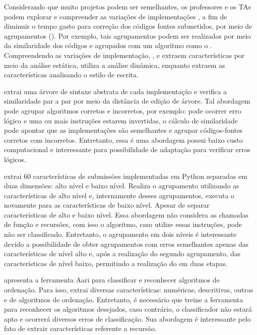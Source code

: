 	Considerando que muito projetos podem ser semelhantes, os professores e os TAs podem
	explorar e compreender as variações de implementações \cite{Yin:2015}, a fim de
	diminuir o tempo gasto para correção dos códigos fontes submetidos, por meio de
	agrupamentos (). Por exemplo, tais agrupamentos podem ser
	realizados por meio da similaridade dos códigos e agrupados com um algoritmo como
	o . Compreendendo as variações de implementação, ,
	 e  extraem características
	por meio da análise estática,  utiliza a análise dinâmica,
	enquanto  extraem as características analisando o estilo de escrita.
	
	 extrai uma árvore de sintaxe abstrata de cada implementação
	e verifica a similaridade par a par por meio da distância de edição de árvore. Tal
	abordagem pode agrupar algoritmos corretos e incorretos, por exemplo: pode ocorrer
	erro lógico e uma ou mais instruções estarem invertidas, o cálculo de similaridade
	pode apontar que as implementações são semelhantes e agrupar códigos-fontes corretos
	com incorretos. Entretanto, essa é uma abordagem possui baixo custo computacional e
	interessante para possibilidade de adaptação para verificar erros lógicos.
	
	 extrai 60 características de submissões implementadas
	em Python separadas em duas dimensões: alto nível e baixo nível. Realiza o agrupamento
	utilizando as características de alto nível e, internamente desses agrupamentos,
	executa o  novamente para as características de baixo nível. Apesar
	de separar características de alto e baixo nível. Essa abordagem não considera as
	chamadas de função e recursões, com isso o algoritmo, caso utilize essas instruções,
	pode não ser classificado. Entretanto, o agrupamento em dois níveis é interessante
	devido a possibilidade de obter agrupamentos com erros semelhantes apenas das
	características de nível alto e, após a realização do segundo agrupamento, das
	características de nível baixo, permitindo a realização do  em
	duas etapas.
	
	 apresenta a ferramenta Aari para classificar e reconhecer
	algoritmos de ordenação. Para isso, extrai diversas características: numéricas,
	descritivas, outras e de algoritmos de ordenação. Entretanto, é necessário que
	treine a ferramenta para reconhecer os algoritmos desejados, caso contrário, o
	classificador não estará apto e ocorrerá diversos erros de classificação. Sua
	abordagem é interessante pelo fato de extrair características referente a recursão.
	
